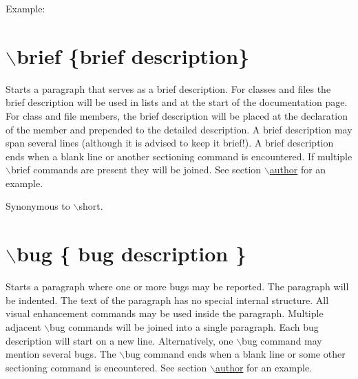 \begin{DoxyParagraph}{Example:}

 
\end{DoxyParagraph}


 \hypertarget{commands_cmdbrief}{}\section{$\backslash$brief \{brief description\}}\label{commands_cmdbrief}
 Starts a paragraph that serves as a brief description. For classes and files the brief description will be used in lists and at the start of the documentation page. For class and file members, the brief description will be placed at the declaration of the member and prepended to the detailed description. A brief description may span several lines (although it is advised to keep it brief!). A brief description ends when a blank line or another sectioning command is encountered. If multiple $\backslash$brief commands are present they will be joined. See section \hyperlink{commands_cmdauthor}{$\backslash$author} for an example.

Synonymous to $\backslash$short.



 \hypertarget{commands_cmdbug}{}\section{$\backslash$bug \{ bug description \}}\label{commands_cmdbug}
 Starts a paragraph where one or more bugs may be reported. The paragraph will be indented. The text of the paragraph has no special internal structure. All visual enhancement commands may be used inside the paragraph. Multiple adjacent $\backslash$bug commands will be joined into a single paragraph. Each bug description will start on a new line. Alternatively, one $\backslash$bug command may mention several bugs. The $\backslash$bug command ends when a blank line or some other sectioning command is encountered. See section \hyperlink{commands_cmdauthor}{$\backslash$author} for an example.



